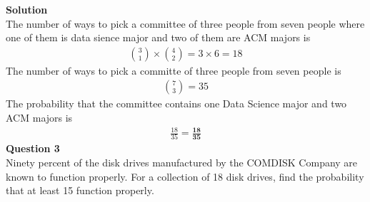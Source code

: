 \documentclass{uofa-eng-assignment}
\begin{document}
\begin{enumerate}
        \textbf{Solution} \\
        The number of ways to pick a committee of three people from seven people where one of them is data sience major and two of them are ACM majors is
        \begin{align*}
            \binom{3}{1} \times \binom{4}{2} = 3 \times 6 = 18
        \end{align*}
        The number of ways to pick a committe of three people from seven people is
        \begin{align*}
            \binom{7}{3} = 35
        \end{align*}
        The probability that the committee contains one Data Science major and two ACM majors is
        \begin{align*}
            \frac{18}{35} = \boldsymbol{\frac{18}{35}}
        \end{align*}
        \textbf{Question 3} \\
        Ninety percent of the disk drives manufactured by the COMDISK Company are known to
        function properly. For a collection of 18 disk drives, find the probability that at least 15 function
        properly.


\end{enumerate}
\end{document}
